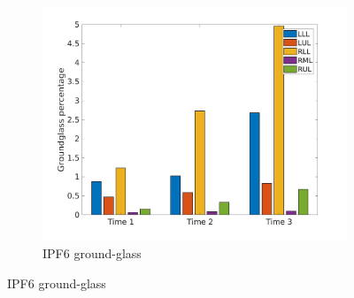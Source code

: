 \begin{figure}[H] 
\centering
\begin{subfigure}{.46\linewidth}%
  \includegraphics[width=\linewidth,trim={{.0\wd0} {.0\wd0} {.0\wd0} {.0\wd0}},clip]{Appendix/Image_AppexA/LobarDistribution/IPF6GroundglassLobarRegionDiseaseDistributionOverTime.jpg} %
  \caption{IPF6 ground-glass}
  \label{fig:IPF6LobarRegionDiseaseDistributionOverTime-a} 
\end{subfigure} 
\hspace{.3in}

\end{figure}

